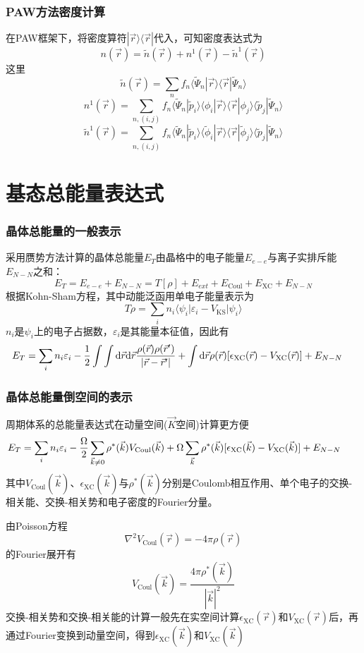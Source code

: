 \documentclass[cjk,slidestop,compress,mathserif,blue]{beamer}
\begin{document}
\frame
{
\frametitle{\textrm{PAW}方法密度计算}
在\textrm{PAW}框架下，将密度算符$|\vec r\rangle\langle\vec r|$代入，可知密度表达式为
$$n(\vec r)=\tilde n(\vec r)+n^1(\vec r)-\tilde n^1(\vec r)$$
这里
$$\tilde n(\vec r)=\sum_nf_n\langle\tilde\Psi_n|\vec r\rangle\langle\vec r|\tilde\Psi_n\rangle$$ 
$$n^1(\vec r)=\sum_{n,(i,j)}f_n\langle\tilde\Psi_n|\tilde p_i\rangle\langle\phi_i|\vec r\rangle\langle\vec r|\phi_j\rangle\langle\tilde p_j|\tilde\Psi_n\rangle$$
$$\tilde n^1(\vec r)=\sum_{n,(i,j)}f_n\langle\tilde\Psi_n|\tilde p_i\rangle\langle\tilde\phi_i|\vec r\rangle\langle\vec r|\tilde\phi_j\rangle\langle\tilde p_j|\tilde\Psi_n\rangle$$
}

\section{基态总能量表达式}
\frame
{
	\frametitle{晶体总能量的一般表示}
采用赝势方法计算的晶体总能量$E_T$由晶格中的电子能量$E_{e-e}$与离子实排斥能$E_{N-N}$之和：
	\begin{displaymath}
		E_T=E_{e-e}+E_{N-N}=T[\rho]+E_{ext}+E_{\mathrm{Coul}}+E_{\mathrm{XC}}+E_{N-N}
	\end{displaymath}
根据\textrm{Kohn-Sham}方程，其中动能泛函用单电子能量表示为
\begin{displaymath}
	T{\rho}=\sum_in_i\langle\psi_i|\varepsilon_i-V_{\mathrm{KS}}|\psi_i\rangle
\end{displaymath}
$n_i$是$\psi_i$上的电子占据数，$\varepsilon_i$是其能量本征值，因此有
\begin{displaymath}
	\hspace*{-12.0pt}	E_T=\sum_in_i\varepsilon_i-\dfrac12\int\int\mathrm{d}\vec r\mathrm{d}\vec r\dfrac{\rho(\vec r)\rho(\vec r^{\prime})}{|\vec r-\vec r^{\prime}|}+\int\mathrm{d}\vec r\rho(\vec r)[\epsilon_{\mathrm{XC}}(\vec r)-V_{\mathrm{XC}}(\vec r)]+E_{N-N}
\end{displaymath}
}

\frame
{
	\frametitle{晶体总能量倒空间的表示}
周期体系的总能量表达式在动量空间($\vec K$空间)计算更方便
\begin{displaymath}
	\hspace*{-18.0pt}	E_T=\sum_in_i\varepsilon_i-\dfrac{\Omega}2\sum_{\vec k\neq 0}\rho^{\ast}(\vec k)V_{\mathrm{Coul}}(\vec k)+\Omega\sum_{\vec k}\rho^{\ast}(\vec k)[\epsilon_{\mathrm{XC}}(\vec k)-V_{\mathrm{XC}}(\vec k)]+E_{N-N}
\end{displaymath}
其中$V_{\mathrm{Coul}}(\vec k)$、$\epsilon_{\mathrm{XC}}(\vec k)$与$\rho^{\ast}(\vec k)$分别是\textrm{Coulomb}相互作用、单个电子的交换-相关能、交换-相关势和电子密度的\textrm{Fourier}分量。

由\textrm{Poisson}方程
\begin{displaymath}
	\nabla^2V_{\mathrm{Coul}}(\vec r)=-4\pi\rho(\vec r)
\end{displaymath}
的\textrm{Fourier}展开有
\begin{displaymath}
	V_{\mathrm{Coul}}(\vec k)=\dfrac{4\pi\rho^{\ast}(\vec k)}{|\vec k|^2}
\end{displaymath}
交换-相关势和交换-相关能的计算一般先在实空间计算$\epsilon_{\mathrm{XC}}(\vec r)$和$V_{\mathrm{XC}}(\vec r)$后，再通过\textrm{Fourier}变换到动量空间，得到$\epsilon_{\mathrm{XC}}(\vec k)$和$V_{\mathrm{XC}}(\vec k)$
}
\end{document}
